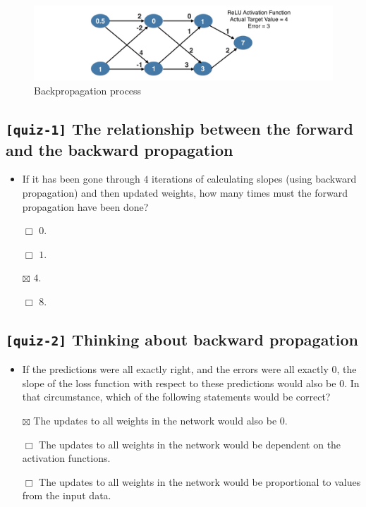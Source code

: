 \documentclass[11pt, twoside]{article}
\begin{document}
\begin{figure}
\centering
\includegraphics{../Figures/11. Backpropagation process.jpg}
\caption{Backpropagation process}
\end{figure}

    \hypertarget{quiz-1-the-relationship-between-the-forward-and-the-backward-propagation}{%
\subsection{\texorpdfstring{\texttt{{[}quiz-1{]}} The relationship
between the forward and the backward
propagation}{{[}quiz-1{]} The relationship between the forward and the backward propagation}}\label{quiz-1-the-relationship-between-the-forward-and-the-backward-propagation}}

\begin{itemize}
\item
  If it has been gone through \(4\) iterations of calculating slopes
  (using backward propagation) and then updated weights, how many times
  must the forward propagation have been done?

  \(\Box\) \(0\).

  \(\Box\) \(1\).

  \(\boxtimes\) \(4\).

  \(\Box\) \(8\).
\end{itemize}

    \hypertarget{quiz-2-thinking-about-backward-propagation}{%
\subsection{\texorpdfstring{\texttt{{[}quiz-2{]}} Thinking about
backward
propagation}{{[}quiz-2{]} Thinking about backward propagation}}\label{quiz-2-thinking-about-backward-propagation}}

\begin{itemize}
\item
  If the predictions were all exactly right, and the errors were all
  exactly \(0\), the slope of the loss function with respect to these
  predictions would also be \(0\). In that circumstance, which of the
  following statements would be correct?

  \(\boxtimes\) The updates to all weights in the network would also be
  \(0\).

  \(\Box\) The updates to all weights in the network would be dependent
  on the activation functions.

  \(\Box\) The updates to all weights in the network would be
  proportional to values from the input data.
\end{itemize}
\end{document}
